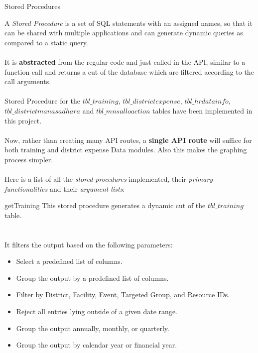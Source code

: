 \documentclass[
10pt, %
a4paper, %
oneside, %
headinclude,footinclude, %
BCOR5mm, %
]{scrartcl}
\begin{document}
\begin{section}{Stored Procedures}

A \textit{Stored Procedure} is a set of SQL statements with an assigned names, so that it can be shared with multiple applications and can generate dynamic queries as compared to a static query. \\ \\
It is \textbf{abstracted} from the regular code and just called in the API, similar to a function call and returns a cut of the database which are filtered according to the call arguments. \\ \\ 
Stored Procedure for the $tbl\_training$, $tbl\_districtexpense$, $tbl\_hrdatainfo$, $tbl\_districtmanasadhara$ and $tbl\_mnsalloaction$ tables have been implemented in this project. \\ \\ 
Now, rather than creating many API routes, a \textbf{single API route} will suffice for both training and district expense Data modules. Also this makes the graphing process simpler. \\ \\
Here is a list of all the \textit{stored procedures} implemented, their \textit{primary functionalities} and their \textit{argument lists}: 

\newpage

\begin{subsection}{getTraining}
This stored procedure generates a dynamic cut of the $tbl\_training$ table. \\ \\ \\
It filters the output based on the following parameters: 
\begin{itemize}
        \item Select a predefined list of columns.
        \item Group the output by a predefined list of columns.
        \item Filter by District, Facility, Event, Targeted Group, and Resource IDs.
        \item Reject all entries lying outside of a given date range.
        \item Group the output annually, monthly, or quarterly.
        \item Group the output by calendar year or financial year.
\end{itemize} 
\\ \\ \\


\end{subsection}
\end{section}
\end{document}
